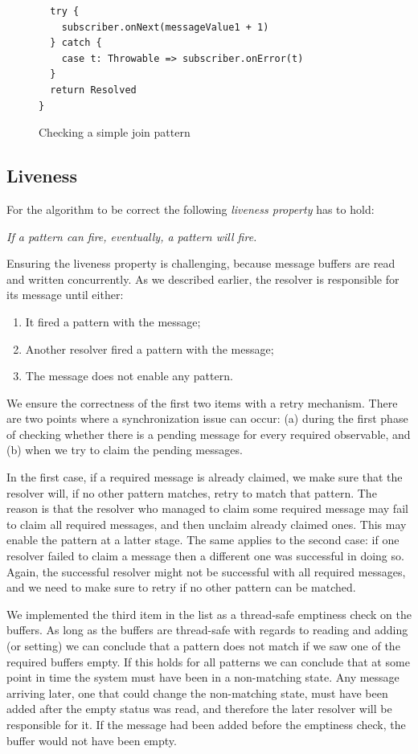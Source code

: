 \documentclass[runningheads]{llncs}
\begin{document}
\begin{sloppypar}
\begin{figure}[ht]
\begin{lstlisting}
  try {
    subscriber.onNext(messageValue1 + 1)
  } catch {
    case t: Throwable => subscriber.onError(t)
  }
  return Resolved
}
\end{lstlisting}
\caption{Checking a simple join pattern}
\label{fig:check-pattern}
\end{figure}


\subsection{Liveness}

For the algorithm to be correct the following {\em liveness property} has to
hold:

\begin{center}
\emph{If a pattern can fire, eventually, a pattern will fire.}
\end{center}
\noindent
Ensuring the liveness property is challenging, because message buffers are
read and written concurrently. As we described earlier, the resolver is
responsible for its message until either:

\begin{enumerate}
\item It fired a pattern with the message;
\item Another resolver fired a pattern with the message;
\item The message does not enable any pattern.
\end{enumerate}
\noindent
We ensure the correctness of the first two items with a retry mechanism. There
are two points where a synchronization issue can occur: (a) during the first phase
of checking whether there is a pending message for every required observable,
and (b) when we try to claim the pending messages.

In the first case, if a required message is already claimed, we make sure that
the resolver will, if no other pattern matches, retry to match that pattern.
The reason is that the resolver who managed to claim some required message may
fail to claim all required messages, and then unclaim already claimed ones.
This may enable the pattern at a latter stage. The same applies to the second
case: if one resolver failed to claim a message then a different one was
successful in doing so. Again, the successful resolver might not be successful
with all required messages, and we need to make sure to retry if no other
pattern can be matched.

We implemented the third item in the list as a thread-safe emptiness check on
the buffers. As long as the buffers are thread-safe with regards to reading
and adding (or setting) we can conclude that a pattern does not match if we
saw one of the required buffers empty. If this holds for all patterns we can
conclude that at some point in time the system must have been in a
non-matching state. Any message arriving later, one that could change the
non-matching state, must have been added after the empty status was read, and
therefore the later resolver will be responsible for it. If the message had
been added before the emptiness check, the buffer would not have been empty.



\end{sloppypar}
\end{document}
